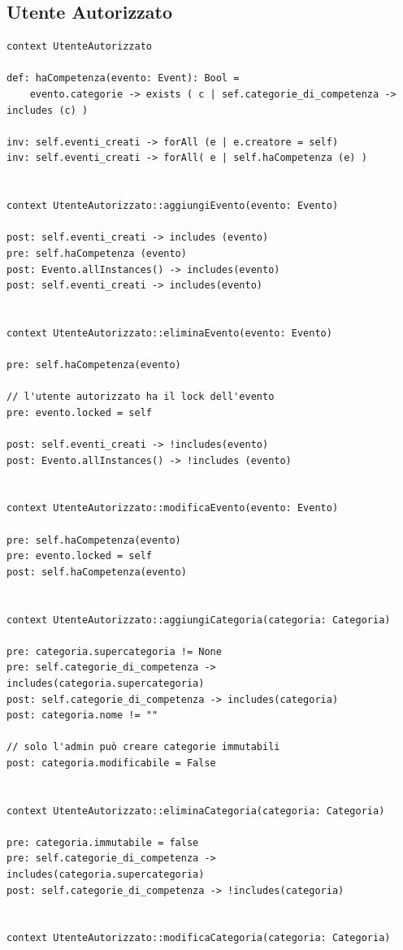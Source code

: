 \documentclass{article}
\begin{document}
\clearpage

\subsection{Utente Autorizzato}

\begin{verbatim}
context UtenteAutorizzato

def: haCompetenza(evento: Event): Bool =
	evento.categorie -> exists ( c | sef.categorie_di_competenza -> includes (c) )

inv: self.eventi_creati -> forAll (e | e.creatore = self)
inv: self.eventi_creati -> forAll( e | self.haCompetenza (e) )


context UtenteAutorizzato::aggiungiEvento(evento: Evento)

post: self.eventi_creati -> includes (evento)
pre: self.haCompetenza (evento) 
post: Evento.allInstances() -> includes(evento)
post: self.eventi_creati -> includes(evento)


context UtenteAutorizzato::eliminaEvento(evento: Evento)

pre: self.haCompetenza(evento)

// l'utente autorizzato ha il lock dell'evento
pre: evento.locked = self

post: self.eventi_creati -> !includes(evento)
post: Evento.allInstances() -> !includes (evento)


context UtenteAutorizzato::modificaEvento(evento: Evento)

pre: self.haCompetenza(evento)
pre: evento.locked = self
post: self.haCompetenza(evento)


context UtenteAutorizzato::aggiungiCategoria(categoria: Categoria)

pre: categoria.supercategoria != None
pre: self.categorie_di_competenza -> includes(categoria.supercategoria)
post: self.categorie_di_competenza -> includes(categoria)
post: categoria.nome != ""

// solo l'admin può creare categorie immutabili
post: categoria.modificabile = False


context UtenteAutorizzato::eliminaCategoria(categoria: Categoria)

pre: categoria.immutabile = false
pre: self.categorie_di_competenza -> includes(categoria.supercategoria)
post: self.categorie_di_competenza -> !includes(categoria)


context UtenteAutorizzato::modificaCategoria(categoria: Categoria)


\end{verbatim}
\end{document}

